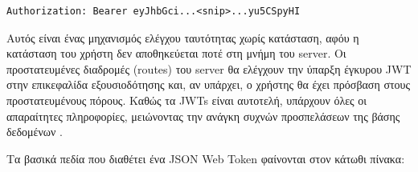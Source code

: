 \begin{lstlisting}
Authorization: Bearer eyJhbGci...<snip>...yu5CSpyHI
\end{lstlisting}

Αυτός είναι ένας μηχανισμός ελέγχου ταυτότητας χωρίς κατάσταση, αφόυ η κατάσταση του χρήστη δεν αποθηκεύεται ποτέ στη μνήμη του server. Οι προστατευμένες διαδρομές (routes) του server θα ελέγχουν την ύπαρξη έγκυρου JWT στην επικεφαλίδα εξουσιοδότησης και, αν υπάρχει, ο χρήστης θα έχει πρόσβαση στους προστατευμένους πόρους. Καθώς τα JWTs είναι αυτοτελή, υπάρχουν όλες οι απαραίτητες πληροφορίες, μειώνοντας την ανάγκη συχνών προσπελάσεων της βάσης δεδομένων \cite{[JWT1]}.

Τα βασικά πεδία που διαθέτει ένα JSON Web Token φαίνονται στον κάτωθι πίνακα:


